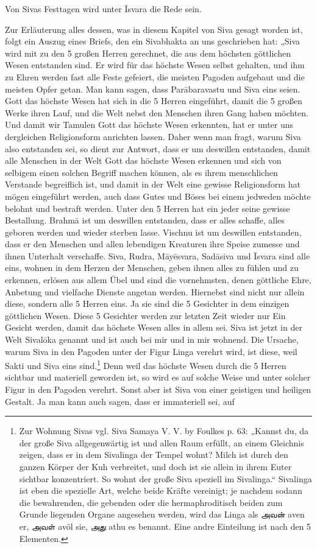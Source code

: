\documentclass{article}
\newcommand{\TamilText}[1]{\texttamil{#1}}
\newcommand{\tam}[1]{\TamilText{#1}}
\begin{document}
Von Sivas Festtagen wird unter \={I}svara die Rede sein.

Zur Erläuterung alles dessen, was in diesem Kapitel von Siva gesagt worden ist, folgt ein Auszug eines Briefs, den ein Sivabhakta an uns geschrieben hat: „Siva wird mit zu den 5 großen Herren gerechnet, die aus dem höchsten göttlichen Wesen entstanden sind. Er wird für das höchste Wesen selbst gehalten, und ihm zu Ehren werden fast alle Feste gefeiert, die meisten Pagoden aufgebaut und die meisten Opfer getan. Man kann sagen, dass Par\={a}baravastu und Siva eins seien. Gott das höchste Wesen hat sich in die 5 Herren eingeführt, damit die 5 großen Werke ihren Lauf, und die Welt nebst den Menschen ihren Gang haben möchten. Und damit wir Tamulen Gott das höchste Wesen erkennten, hat er unter uns dergleichen Religionsform anrichten lassen. Daher wenn man fragt, warum Siva also entstanden sei, so dient zur Antwort, dass er um deswillen entstanden, damit alle Menschen in der Welt Gott das höchste Wesen erkennen und sich von selbigem einen solchen Begriff machen können, als es ihrem menschlichen Verstande begreiflich ist, und damit in der Welt eine gewisse Religionsform hat mögen eingeführt werden, auch dass Gutes und Böses bei einem jedweden möchte belohnt und bestraft werden. Unter den 5 Herren hat ein jeder seine gewisse Bestallung. Brahm\={a} ist um deswillen entstanden, dass er alles schaffe, alles geboren werden und wieder sterben lasse. Vischnu ist um deswillen entstanden, dass er den Menschen und allen lebendigen Kreaturen ihre Speise zumesse und ihnen Unterhalt verschaffe. Siva, Rudra, M\={a}y\={e}svara, Sad\={a}siva und \={I}svara sind alle eins, wohnen in dem Herzen der Menschen, geben ihnen alles zu fühlen und zu erkennen, erlösen aus allem Übel und sind die vornehmsten, denen göttliche Ehre, Anbetung und vielfache Dienste angetan werden. Hiernebst sind nicht nur allein diese, sondern alle 5 Herren eins. Ja sie sind die 5 Gesichter in dem einzigen göttlichen Wesen. Diese 5 Gesichter werden zur letzten Zeit wieder nur Ein Gesicht werden, damit das höchste Wesen alles in allem sei. Siva ist jetzt in der Welt Sival\={o}ka genannt und ist auch bei mir und in mir wohnend. Die Ursache, warum Siva in den Pagoden unter der Figur Linga verehrt wird, ist diese, weil Sakti und Siva eins sind.\footnote{Zur Wohnung Sivas vgl. Siva Samaya V. V. by Foulkes p. 63: „Kannst du, da der große Siva allgegenwärtig ist und allen Raum erfüllt, an einem Gleichnis zeigen, dass er in dem Sivalinga der Tempel wohnt? Milch ist durch den ganzen Körper der Kuh verbreitet, und doch ist sie allein in ihrem Euter sichtbar konzentriert. So wohnt der große Siva speziell im Sivalinga.“ Sivalinga ist eben die spezielle Art, welche beide Kräfte vereinigt; je nachdem sodann die bewahrenden, die gebenden oder die hermaphroditisch beiden zum Grunde liegenden Organe angesehen werden, wird das Linga als \tam{அவன்} aven er, \tam{அவள்} avöl sie, \tam{அது} athu es benannt. Eine andre Einteilung ist nach den 5 Elementen.} Denn weil das höchste Wesen durch die 5 Herren sichtbar und materiell geworden ist, so wird es auf solche Weise und unter solcher Figur in den Pagoden verehrt. Sonst aber ist Siva von einer geistigen und heiligen Gestalt. Ja man kann auch sagen, dass er immateriell sei, auf 
\end{document}
